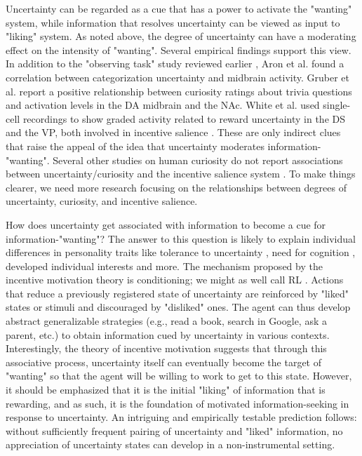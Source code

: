 Uncertainty can be regarded as a cue that has a power to activate the "wanting" system, while information that resolves uncertainty can be viewed as input to "liking" system. As noted above, the degree of uncertainty can have a moderating effect on the intensity of "wanting". Several empirical findings support this view. In addition to the "observing task" study reviewed earlier \cite{bromberg-martin_midbrain_2009}, Aron et al. \cite{aron_human_2004} found a correlation between categorization uncertainty and midbrain activity. Gruber et al. \cite{gruber_states_2014} report a positive relationship between curiosity ratings about trivia questions and activation levels in the \ac{DA} midbrain and the \ac{NAc}. White et al. \cite{white_neural_2019} used single-cell recordings to show graded activity related to reward uncertainty in the \ac{DS} and the \ac{VP}, both involved in incentive salience \cite{smith_ventral_2009,volkow_nonhedonic_2002}. These are only indirect clues that raise the appeal of the idea that uncertainty moderates information-"wanting". Several other studies on human curiosity do not report associations between uncertainty/curiosity and the incentive salience system \cite{kang_wick_2009,jepma_neural_2012,van_lieshout_induction_2018}. To make things clearer, we need more research focusing on the relationships between degrees of uncertainty, curiosity, and incentive salience.

How does uncertainty get associated with information to become a cue for information-"wanting"? The answer to this question is likely to explain individual differences in personality traits like tolerance to uncertainty \cite{hillen_tolerance_2017}, need for cognition \cite{cacioppo_need_1982}, developed individual interests \cite{hidi_four-phase_2006} and more. The mechanism proposed by the incentive motivation theory is conditioning; we might as well call \ac{RL} \cite{maia_reinforcement_2009}. Actions that reduce a previously registered state of uncertainty are reinforced by "liked" states or stimuli and discouraged by "disliked" ones. The agent can thus develop abstract generalizable strategies (e.g., read a book, search in Google, ask a parent, etc.) to obtain information cued by uncertainty in various contexts. Interestingly, the theory of incentive motivation suggests that through this associative process, uncertainty itself can eventually become the target of "wanting" so that the agent will be willing to work to get to this state. However, it should be emphasized that it is the initial "liking" of information that is rewarding, and as such, it is the foundation of motivated information-seeking in response to uncertainty. An intriguing and empirically testable prediction follows: without sufficiently frequent pairing of uncertainty and "liked" information, no appreciation of uncertainty states can develop in a non-instrumental setting.

